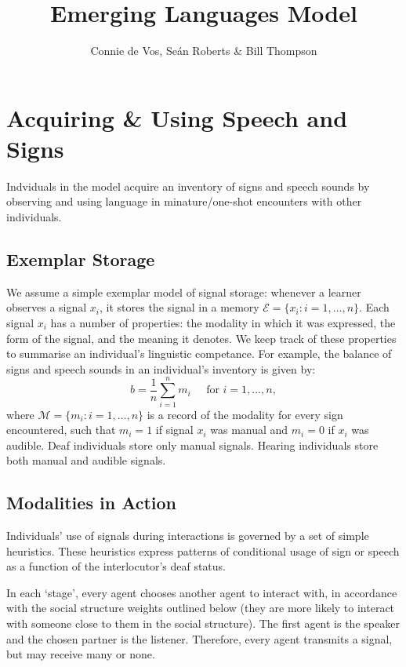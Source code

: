 \documentclass[11pt, oneside]{article}
\title{Emerging Languages Model}
\author{Connie de Vos, Se\'{a}n Roberts \& Bill Thompson}
\begin{document}
\maketitle

\section{Acquiring \& Using Speech and Signs} %
\label{sec:Acq}
Indviduals in the model acquire an inventory of signs and speech sounds by observing and using language in minature/one-shot encounters with other individuals.

\subsection{Exemplar Storage} %
\label{sub:exemplar_storage}
We assume a simple exemplar model of signal storage: whenever a learner observes a signal $x_i$, it stores the signal in a memory $\mathcal{E} = \{x_i\colon i = 1,\ldots,n\}$. Each signal $x_i$ has a number of properties: the modality in which it was expressed, the form of the signal, and the meaning it denotes. We keep track of these properties to summarise an individual's linguistic competance. For example, the balance of signs and speech sounds in an individual's inventory is given by:
\begin{equation}
	b = \frac{1}{n}\sum_{i=1}^n m_i \;\;\;\;\; \mbox{for } i= 1,\ldots,n,
\end{equation}
where $\mathcal{M} = \{m_i\colon i =1,\ldots,n\}$ is a record of the modality for every sign encountered, such that $m_i = 1$ if signal $x_i$ was manual and $m_i = 0$ if $x_i$ was audible. Deaf individuals store only manual signals. Hearing individuals store both manual and audible signals.

\subsection{Modalities in Action} %
\label{sub:modalities_in_action}
Individuals' use of signals during interactions is governed by a set of simple heuristics. These heuristics express patterns of conditional usage of sign or speech as a function of the interlocutor's deaf status.

In each `stage', every agent chooses another agent to interact with, in accordance with the social structure weights outlined below (they are more likely to interact with someone close to them in the social structure). The first agent is the speaker and the chosen partner is the listener.  Therefore, every agent transmits a signal, but may receive many or none.
\end{document}
